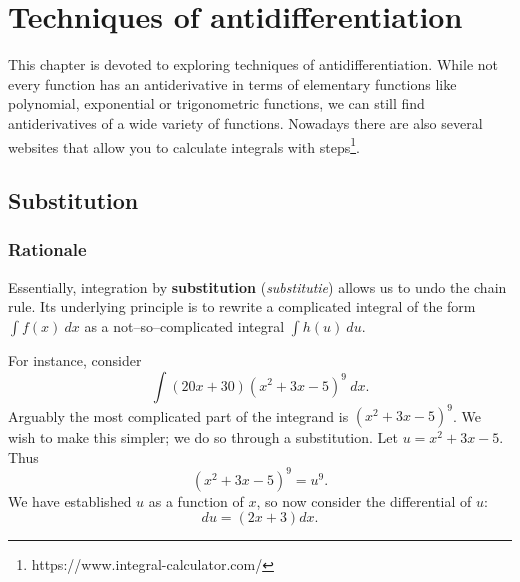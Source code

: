 
\section{Techniques of antidifferentiation}\label{sec:techniques_of_antidifferentiation}
This chapter is devoted to exploring techniques of antidifferentiation. While not every function has an antiderivative in terms of elementary functions like polynomial, exponential or trigonometric functions, we can still find antiderivatives of a wide variety of functions. Nowadays there are also several websites that allow you to calculate integrals with steps\footnote{https://www.integral-calculator.com/}. 

\subsection{Substitution}\label{sec:substitution}
\subsubsection{Rationale}
\ifcourse
	\checkoddpage
{}
\fi
Essentially, integration by \textbf{substitution} (\textit{substitutie}) allows us to undo the chain rule. Its underlying principle is to rewrite a complicated integral of the form $\int f(x)\ dx$ as a not--so--complicated integral $\int h(u)\ du$. 

For instance, consider
$$\int (20x+30)(x^2+3x-5)^9\ dx.$$
Arguably the most complicated part of the integrand is $(x^2+3x-5)^9$. We wish to make this simpler; we do so through a substitution. Let $u=x^2+3x-5$. Thus 
$$(x^2+3x-5)^9 = u^9.$$
We have established $u$ as a function of $x$, so now consider the differential of $u$: 
$$du = (2x+3)dx.$$ 

